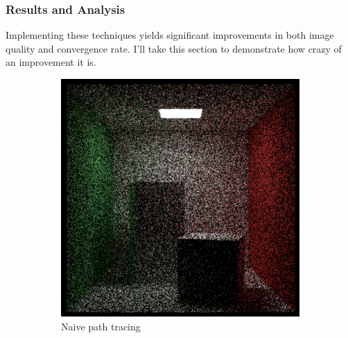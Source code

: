 \documentclass[12pt]{article}
\begin{document}
\subsubsection{Results and Analysis}

Implementing these techniques yields significant improvements in both image quality and convergence rate. I'll take this section to demonstrate how crazy of an improvement it is.

\begin{figure}[H]
    \centering
    \begin{subfigure}[b]{0.45\textwidth}
        \centering
        \includegraphics[width=\textwidth]{images/25_samp/randomPDF.png}
        \caption{Naive path tracing}
        \label{fig:naive_sampling}
    \end{subfigure}
    \hfill
    \begin{subfigure}[b]{0.45\textwidth}
        \centering

\end{subfigure}
\end{figure}
\end{document}
